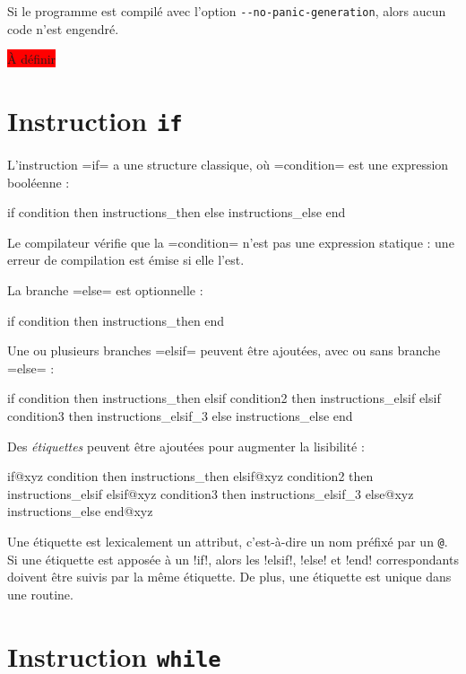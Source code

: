 Si le programme est compilé avec l'option \texttt{-{}-no-panic-generation}, alors aucun code n'est engendré.





\colorbox{red}{À définir}


\section{Instruction \texttt{if}}

L'instruction \plm=if= a une structure classique, où \plm=condition= est une expression booléenne :
\begin{PLM}
if condition then
  instructions_then
else
  instructions_else
end
\end{PLM}

Le compilateur vérifie que la \plm=condition= n'est pas une expression statique : une erreur de compilation est émise si elle l'est.

La branche \plm=else= est optionnelle :
\begin{PLM}
if condition then
  instructions_then
end
\end{PLM}


Une ou plusieurs branches \plm=elsif= peuvent être ajoutées, avec ou sans branche \plm=else= :
\begin{PLM}
if condition then
  instructions_then
elsif condition2 then
  instructions_elsif
elsif condition3 then
  instructions_elsif_3
else
  instructions_else
end
\end{PLM}


Des \emph{étiquettes} peuvent être ajoutées pour augmenter la lisibilité :
\begin{PLM}
if@xyz condition then
  instructions_then
elsif@xyz condition2 then
  instructions_elsif
elsif@xyz condition3 then
  instructions_elsif_3
else@xyz
  instructions_else
end@xyz
\end{PLM}

Une étiquette est lexicalement un attribut, c'est-à-dire un nom préfixé par un \texttt{@}. Si une étiquette est apposée à un \plm!if!, alors les \plm!elsif!, \plm!else! et \plm!end! correspondants doivent être suivis par la même étiquette. De plus, une étiquette est unique dans une routine.


\section{Instruction \texttt{while}}

